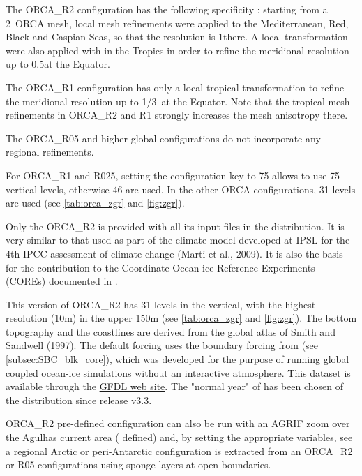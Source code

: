 \documentclass[../tex_main/NEMO_manual]{subfiles}
\begin{document}
The ORCA\_R2 configuration has the following specificity : starting from a 2\deg~ORCA mesh, 
local mesh refinements were applied to the Mediterranean, Red, Black and Caspian Seas, 
so that the resolution is 1\deg {}\deg there. A local transformation were also applied 
with in the Tropics in order to refine the meridional resolution up to 0.5\deg at the Equator.

The ORCA\_R1 configuration has only a local tropical transformation  to refine the meridional 
resolution up to 1/3\deg~at the Equator. Note that the tropical mesh refinements in ORCA\_R2 
and R1 strongly increases the mesh anisotropy there.

The ORCA\_R05 and higher global configurations do not incorporate any regional refinements.  

For ORCA\_R1 and R025, setting the configuration key to 75 allows to use 75 vertical levels, 
otherwise 46 are used. In the other ORCA configurations, 31 levels are used 
(see \autoref{tab:orca_zgr}  and \autoref{fig:zgr}).

Only the ORCA\_R2 is provided with all its input files in the \NEMO distribution. 
It is very similar to that used as part of the climate model developed at IPSL for the 4th IPCC 
assessment of climate change (Marti et al., 2009). It is also the basis for the \NEMO contribution 
to the Coordinate Ocean-ice Reference Experiments (COREs) documented in \citet{Griffies_al_OM09}. 

This version of ORCA\_R2 has 31 levels in the vertical, with the highest resolution (10m) 
in the upper 150m (see \autoref{tab:orca_zgr} and \autoref{fig:zgr}). 
The bottom topography and the coastlines are derived from the global atlas of Smith and Sandwell (1997). 
The default forcing uses the boundary forcing from \citet{Large_Yeager_Rep04} (see \autoref{subsec:SBC_blk_core}), 
which was developed for the purpose of running global coupled ocean-ice simulations 
without an interactive atmosphere. This \citet{Large_Yeager_Rep04} dataset is available 
through the \href{http://nomads.gfdl.noaa.gov/nomads/forms/mom4/CORE.html}{GFDL web site}. 
The "normal year" of \citet{Large_Yeager_Rep04} has been chosen of the \NEMO distribution 
since release v3.3. 

ORCA\_R2 pre-defined configuration can also be run with an AGRIF zoom over the Agulhas 
current area (   defined) and, by setting the appropriate variables, see 
a regional Arctic or peri-Antarctic configuration is extracted from an ORCA\_R2 or R05 configurations
using sponge layers at open boundaries. 
\end{document}
